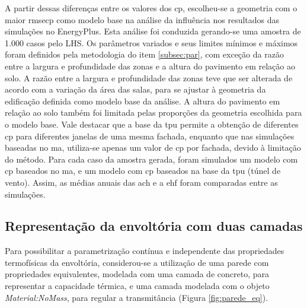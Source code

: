 A partir dessas diferenças entre os valores dos \acrshort{cp}, escolheu-se a geometria com o maior  \gls{rmsecp} como modelo base na análise da influência nos resultados das simulações no EnergyPlus.
Esta análise foi conduzida gerando-se uma amostra de 1.000 casos pelo LHS.
Os parâmetros variados e seus limites mínimos e máximos foram definidos pela metodologia do item \ref{subsec:par}, com exceção da razão entre a largura e profundidade das zonas e a altura do pavimento em relação ao solo.
A razão entre a largura e profundidade das zonas teve que ser alterada de acordo com a variação da área das salas, para se ajustar à geometria da edificação definida como modelo base da análise.
A altura do pavimento em relação ao solo também foi limitada pelas proporções da geometria escolhida para o modelo base.
Vale destacar que a base da \acrshort{tpu} permite a obtenção de diferentes \acrshort{cp} para diferentes janelas de uma mesma fachada, enquanto que nas simulações baseadas no \acrlong{ma}, utiliza-se apenas um valor de \acrshort{cp} por fachada, devido à limitação do método. 
Para cada caso da amostra gerada, foram simulados um modelo com \acrshort{cp} baseados no \acrlong{ma}, e um modelo com \acrshort{cp} baseados na base da \acrshort{tpu} (túnel de vento).
Assim, as médias anuais das \acrfull{ach} e a \acrshort{ehf} foram comparadas entre as simulações.

%		

\subsection*{Representação da envoltória com duas camadas}

Para possibilitar a parametrização contínua e independente das propriedades termofísicas da envoltória, considerou-se a utilização de uma parede com propriedades equivalentes, modelada com uma camada de concreto, para representar a capacidade térmica, e uma camada modelada com o objeto \textit{Material:NoMass}, para regular a transmitância (Figura \ref{fig:parede_eq}).

